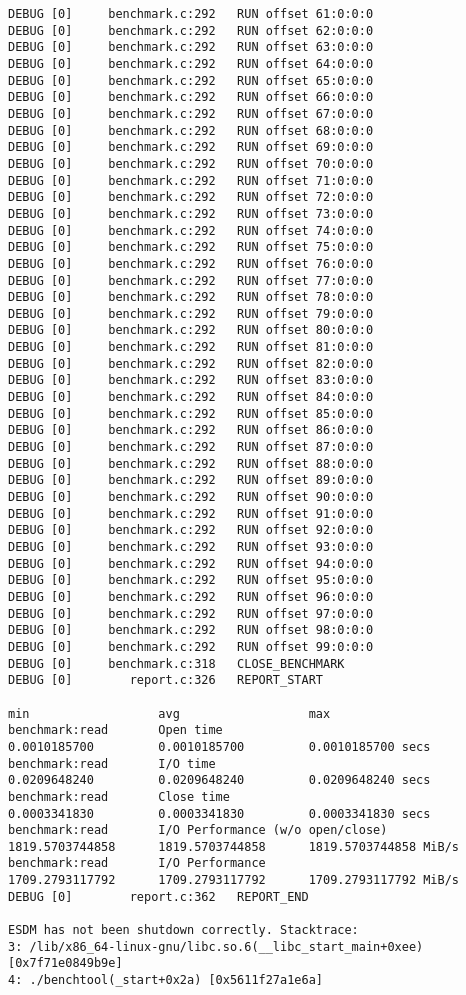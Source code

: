 \begin{verbatim}
DEBUG [0]     benchmark.c:292   RUN offset 61:0:0:0
DEBUG [0]     benchmark.c:292   RUN offset 62:0:0:0
DEBUG [0]     benchmark.c:292   RUN offset 63:0:0:0
DEBUG [0]     benchmark.c:292   RUN offset 64:0:0:0
DEBUG [0]     benchmark.c:292   RUN offset 65:0:0:0
DEBUG [0]     benchmark.c:292   RUN offset 66:0:0:0
DEBUG [0]     benchmark.c:292   RUN offset 67:0:0:0
DEBUG [0]     benchmark.c:292   RUN offset 68:0:0:0
DEBUG [0]     benchmark.c:292   RUN offset 69:0:0:0
DEBUG [0]     benchmark.c:292   RUN offset 70:0:0:0
DEBUG [0]     benchmark.c:292   RUN offset 71:0:0:0
DEBUG [0]     benchmark.c:292   RUN offset 72:0:0:0
DEBUG [0]     benchmark.c:292   RUN offset 73:0:0:0
DEBUG [0]     benchmark.c:292   RUN offset 74:0:0:0
DEBUG [0]     benchmark.c:292   RUN offset 75:0:0:0
DEBUG [0]     benchmark.c:292   RUN offset 76:0:0:0
DEBUG [0]     benchmark.c:292   RUN offset 77:0:0:0
DEBUG [0]     benchmark.c:292   RUN offset 78:0:0:0
DEBUG [0]     benchmark.c:292   RUN offset 79:0:0:0
DEBUG [0]     benchmark.c:292   RUN offset 80:0:0:0
DEBUG [0]     benchmark.c:292   RUN offset 81:0:0:0
DEBUG [0]     benchmark.c:292   RUN offset 82:0:0:0
DEBUG [0]     benchmark.c:292   RUN offset 83:0:0:0
DEBUG [0]     benchmark.c:292   RUN offset 84:0:0:0
DEBUG [0]     benchmark.c:292   RUN offset 85:0:0:0
DEBUG [0]     benchmark.c:292   RUN offset 86:0:0:0
DEBUG [0]     benchmark.c:292   RUN offset 87:0:0:0
DEBUG [0]     benchmark.c:292   RUN offset 88:0:0:0
DEBUG [0]     benchmark.c:292   RUN offset 89:0:0:0
DEBUG [0]     benchmark.c:292   RUN offset 90:0:0:0
DEBUG [0]     benchmark.c:292   RUN offset 91:0:0:0
DEBUG [0]     benchmark.c:292   RUN offset 92:0:0:0
DEBUG [0]     benchmark.c:292   RUN offset 93:0:0:0
DEBUG [0]     benchmark.c:292   RUN offset 94:0:0:0
DEBUG [0]     benchmark.c:292   RUN offset 95:0:0:0
DEBUG [0]     benchmark.c:292   RUN offset 96:0:0:0
DEBUG [0]     benchmark.c:292   RUN offset 97:0:0:0
DEBUG [0]     benchmark.c:292   RUN offset 98:0:0:0
DEBUG [0]     benchmark.c:292   RUN offset 99:0:0:0
DEBUG [0]     benchmark.c:318   CLOSE_BENCHMARK
DEBUG [0]        report.c:326   REPORT_START
                                                                               min                  avg                  max
benchmark:read       Open time                                        0.0010185700         0.0010185700         0.0010185700 secs
benchmark:read       I/O time                                         0.0209648240         0.0209648240         0.0209648240 secs
benchmark:read       Close time                                       0.0003341830         0.0003341830         0.0003341830 secs
benchmark:read       I/O Performance (w/o open/close)              1819.5703744858      1819.5703744858      1819.5703744858 MiB/s
benchmark:read       I/O Performance                               1709.2793117792      1709.2793117792      1709.2793117792 MiB/s
DEBUG [0]        report.c:362   REPORT_END

ESDM has not been shutdown correctly. Stacktrace:
3: /lib/x86_64-linux-gnu/libc.so.6(__libc_start_main+0xee) [0x7f71e0849b9e]
4: ./benchtool(_start+0x2a) [0x5611f27a1e6a]
\end{verbatim}

